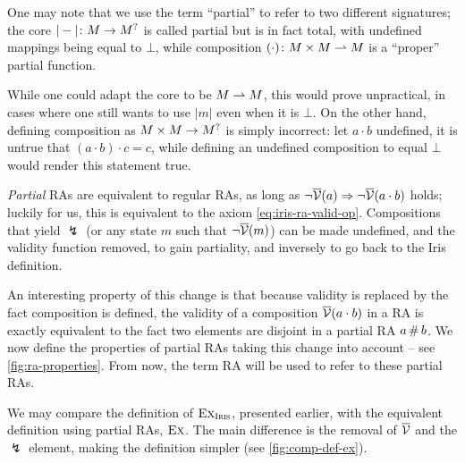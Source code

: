 \begin{remark}
	One may note that we use the term ``partial'' to refer to two different signatures; the core $|-|\colon M \rightarrow M^?$ is called partial but is in fact total, with undefined mappings being equal to $\bot$, while composition $(\cdot)\colon M\times M\rightharpoonup M$ is a ``proper'' partial function.

	While one could adapt the core to be $M\rightharpoonup M$, this would prove unpractical, in cases where one still wants to use $|m|$ even when it is $\bot$. On the other hand, defining composition as $M\times M\rightarrow M^?$ is simply incorrect: let $a\cdot b$ undefined, it is untrue that $(a\cdot b)\cdot c=c$, while defining an undefined composition to equal $\bot$ would render this statement true.
\end{remark}

\emph{Partial} RAs are equivalent to regular RAs, as long as ${\neg\overline{\cal V}(a)\Rightarrow \neg\overline{\cal V}(a\cdot b)}$ holds; luckily for us, this is equivalent to the axiom \eqref{eq:iris-ra-valid-op}. Compositions that yield $\lightning$ (or any state $m$ such that $\neg\overline{\cal V}(m)$) can be made undefined, and the validity function removed, to gain partiality, and inversely to go back to the Iris definition.

An interesting property of this change is that because validity is replaced by the fact composition is defined, the validity of a composition $\overline{\cal V}(a\cdot b)$ in a RA is exactly equivalent to the fact two elements are disjoint in a partial RA $a \operatorname{\#} b$. We now define the properties of partial RAs taking this change into account -- see \autoref{fig:ra-properties}. From now, the term RA will be used to refer to these partial RAs.

We may compare the definition of $\textsc{Ex}_{\textsc{Iris}}$, presented earlier, with the equivalent definition using partial RAs, $\textsc{Ex}$. The main difference is the removal of $\overline{\cal V}$ and the $\lightning$ element, making the definition simpler (see \autoref{fig:comp-def-ex}).

